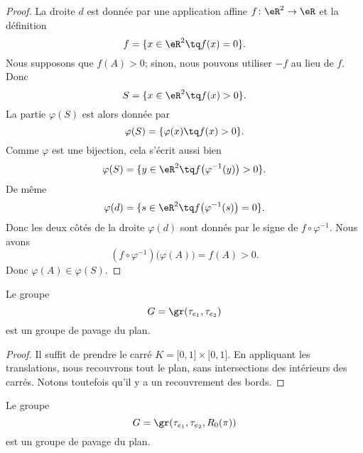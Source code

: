 \begin{proof}
    La droite \( d\) est donnée par une application affine \( f\colon \eR^2\to \eR\) et la définition
    \begin{equation}
        f=\{ x\in \eR^2\tq f(x)=0 \}.
    \end{equation}
    Nous supposons que \( f(A)>0\); sinon, nous pouvons utiliser \( -f\) au lieu de \( f\). Donc
    \begin{equation}
        S=\{ x\in \eR^2\tq f(x)>0 \}.
    \end{equation}
    La partie \( \varphi(S)\) est alors donnée par
    \begin{equation}
        \varphi(S)=\{ \varphi(x)\tq f(x)>0 \}.
    \end{equation}
    Comme \( \varphi\) est une bijection, cela s'écrit aussi bien
    \begin{equation}
        \varphi(S)=\{ y\in \eR^2\tq f\big( \varphi^{-1}(y) \big)>0 \}.
    \end{equation}
    De même
    \begin{equation}
        \varphi(d)=\{ s\in \eR^2\tq f\big( \varphi^{-1}(s) \big)=0 \}.
    \end{equation}
    Donc les deux côtés de la droite \( \varphi(d)\) sont donnés par le signe de \( f\circ \varphi^{-1}\). Nous avons
    \begin{equation}
        (f\circ\varphi^{-1})\big( \varphi(A) \big)=f(A)>0.
    \end{equation}
    Donc \( \varphi(A)\in \varphi(S)\).
\end{proof}

\begin{lemma}           \label{LEMooZOXVooTJiLTF}
    Le groupe 
    \begin{equation}
        G=\gr(\tau_{e_1}, \tau_{e_2})
    \end{equation}
    est un groupe de pavage du plan.
\end{lemma}

\begin{proof}
    Il suffit de prendre le carré \( K=\mathopen[ 0 , 1 \mathclose]\times \mathopen[ 0 , 1 \mathclose]\). En appliquant les translations, nous recouvrons tout le plan, sans intersections des intérieurs des carrés. Notons toutefois qu'il y a un recouvrement des bords.
\end{proof}

\begin{lemma}    \label{LEMooTMRGooChBzZg}
    Le groupe 
    \begin{equation}
        G=\gr(\tau_{e_1}, \tau_{e_2}, R_0(\pi))
    \end{equation}
    est un groupe de pavage du plan.
\end{lemma}

